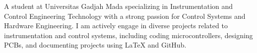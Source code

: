 

\begin{cvparagraph}

A student at Universitas Gadjah Mada specializing in Instrumentation and Control Engineering Technology with a strong passion for Control Systems and Hardware Engineering. I am actively engage in diverse projects related to instrumentation and control systems, including coding microcontrollers, designing PCBs, and documenting projects using LaTeX and GitHub.
\end{cvparagraph}